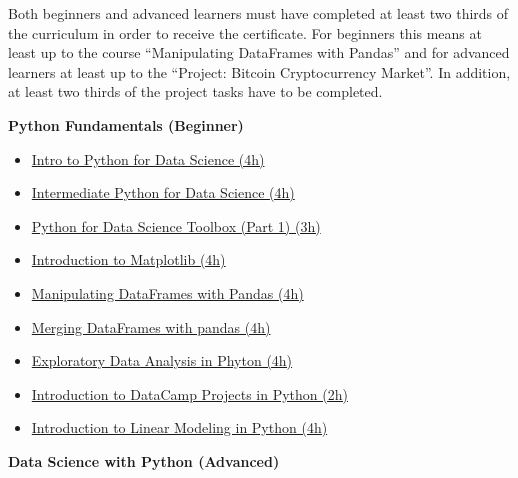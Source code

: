 \documentclass[
  11pt,
]{article}
\providecommand{\tightlist}{%
  \setlength{\itemsep}{0pt}\setlength{\parskip}{0pt}}
\newenvironment{tipsp}[1]
  {
  \begin{itemize}
  \footnotesize
  \renewcommand{\labelitemi}{
    \raisebox{-.7\height}[0pt][0pt]{
      {\setkeys{Gin}{width=3em,keepaspectratio}
        \texttt{[image: images/\#1.png]}}
    }
  }
  \setlength{\fboxsep}{1em}
  \begin{pbox}
  \item
  }
  {
  \end{pbox}
  \end{itemize}
  }
\begin{document}
Both beginners and advanced learners must have completed at least two thirds of the curriculum in order to receive the certificate. For beginners this means at least up to the course ``Manipulating DataFrames with Pandas'' and for advanced learners at least up to the ``Project: Bitcoin Cryptocurrency Market''. In addition, at least two thirds of the project tasks have to be completed.

\begin{tipsp}p

\textbf{Python Fundamentals (Beginner) }

\begin{itemize}
\tightlist
\item
  \href{https://www.datacamp.com/courses/introduction-to-data-science-in-python}{Intro to Python for Data Science (4h)}
\item
  \href{https://www.datacamp.com/courses/intermediate-python-for-data-science}{Intermediate Python for Data Science (4h)}
\item
  \href{https://www.datacamp.com/courses/python-data-science-toolbox-part-1}{Python for Data Science Toolbox (Part 1) (3h)}
\item
  \href{https://www.datacamp.com/courses/introduction-to-matplotlib}{Introduction to Matplotlib (4h)}
\item
  \href{https://www.datacamp.com/courses/manipulating-dataframes-with-pandas}{Manipulating DataFrames with Pandas (4h)}
\item
  \href{https://www.datacamp.com/courses/merging-dataframes-with-pandas}{Merging DataFrames with pandas (4h)}
\item
  \href{https://www.datacamp.com/courses/exploratory-data-analysis-in-python}{Exploratory Data Analysis in Phyton (4h)}
\item
  \href{https://www.datacamp.com/projects/33}{Introduction to DataCamp Projects in Python (2h)}
\item
  \href{https://www.datacamp.com/courses/introduction-to-linear-modeling-in-python}{Introduction to Linear Modeling in Python (4h)}
\end{itemize}

\textbf{Data Science with Python (Advanced) }


\end{tipsp}
\end{document}

